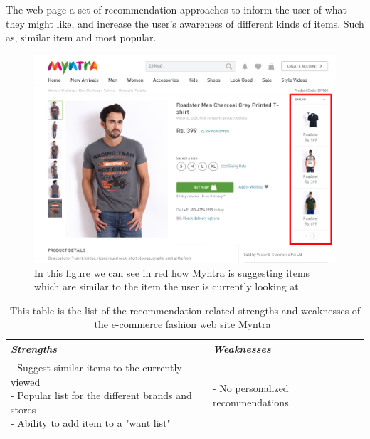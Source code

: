     The web page a set of recommendation approaches to inform the user of what they might like, and increase the user's awareness of different kinds of items. Such as, similar item and most popular.
    \begin{figure}[H]
        \centering
        \includegraphics[width=5in]{image/myntiaSimilarExample.png}
        \caption[Example of Myntra's "similar item" approach]{In this figure we can see in red how Myntra is suggesting items which are similar to the item the user is currently looking at}
        \label{figure:myntiaSimilarEx}
    \end{figure}
    \begin{table}[H]
        \centering
        \begin{tabular}{l|l}
            \toprule
            \emph{Strengths} & \emph{Weaknesses} \\ \hline
            \pbox{9cm}{
                - Suggest similar items to the currently viewed \\
                - Popular list for the different brands and stores \\
                - Ability to add item to a "want list"
            } & \pbox{9cm}{
                - No personalized recommendations \\
            } \\ \bottomrule
        \end{tabular}
        \caption[Recommendation related strengths and weaknesses of Myntra~\cite{myntra}]{This table is the list of the recommendation related strengths and weaknesses of the e-commerce fashion web site Myntra~\cite{myntra}}
        \label{table:ecommerceMyntra}
    \end{table}


